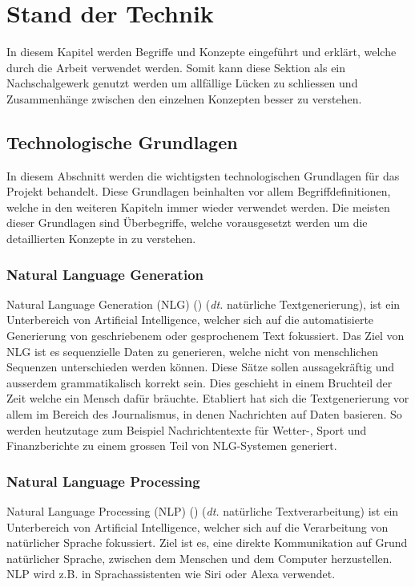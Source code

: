 \chapter{Stand der Technik}
\label{ch:StandDerTechnik}
In diesem Kapitel werden Begriffe und Konzepte eingeführt und erklärt, welche durch die Arbeit verwendet
werden. Somit kann diese Sektion als ein Nachschalgewerk genutzt werden um allfällige Lücken zu schliessen
und Zusammenhänge zwischen den einzelnen Konzepten besser zu verstehen.

\section{Technologische Grundlagen}
\label{sec:technische-grundlagen}
In diesem Abschnitt werden die wichtigsten technologischen Grundlagen für das Projekt behandelt. Diese Grundlagen
beinhalten vor allem Begriffdefinitionen, welche in den weiteren Kapiteln immer wieder verwendet werden. Die meisten
dieser Grundlagen sind Überbegriffe, welche vorausgesetzt werden um die detaillierten Konzepte in
 zu verstehen.

\subsection{Natural Language Generation}
\label{sub:natural-language-generation}
Natural Language Generation (NLG) (\cite{wikipedia_2019_nlg}) (\textit{dt.} natürliche Textgenerierung), ist ein
Unterbereich von Artificial Intelligence, welcher sich auf die automatisierte Generierung von geschriebenem oder
gesprochenem Text fokussiert.
\newline
\newline
Das Ziel von \gls{NLG} ist es sequenzielle Daten zu generieren, welche nicht von menschlichen Sequenzen unterschieden
werden können. Diese Sätze sollen aussagekräftig und ausserdem grammatikalisch korrekt sein. Dies geschieht in einem
Bruchteil der Zeit welche ein Mensch dafür bräuchte.
\newline
\newline
Etabliert hat sich die Textgenerierung vor allem im Bereich des Journalismus, in denen Nachrichten auf Daten basieren.
So werden heutzutage zum Beispiel Nachrichtentexte für Wetter-, Sport und Finanzberichte zu einem grossen Teil von
NLG-Systemen generiert.

\subsection{Natural Language Processing}
\label{sub:natural-language-processing}
Natural Language Processing (NLP) (\cite{wikipedia_2019_nlp}) (\textit{dt.} natürliche Textverarbeitung) ist ein
Unterbereich von Artificial Intelligence, welcher sich auf die Verarbeitung von natürlicher Sprache fokussiert. Ziel ist
es, eine direkte Kommunikation auf Grund natürlicher Sprache, zwischen dem Menschen und dem Computer herzustellen. NLP
wird z.B. in Sprachassistenten wie Siri oder Alexa verwendet.

